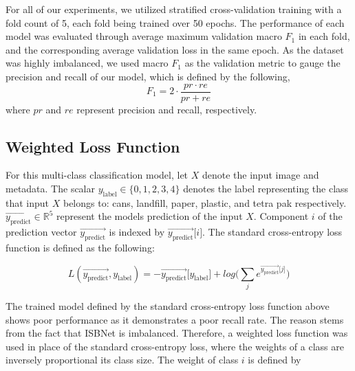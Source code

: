 \documentclass[conference]{ieeeconf}
\newcommand{\ora}[1]{\overrightarrow{#1}}
\begin{document}
For all of our experiments, we utilized stratified cross-validation training with a fold count of 5, each fold being trained over 50 epochs. The performance of each model was evaluated through average maximum validation macro $F_1$ in each fold, and the corresponding average validation loss in the same epoch. As the dataset was highly imbalanced, we used macro $F_1$ as the validation metric to gauge the precision and recall of our model, which is defined by the following,
\begin{equation*}
    F_1 = 2\cdot \frac{pr \cdot re}{pr + re}
\end{equation*}
where $pr$ and $re$ represent precision and recall, respectively.


\subsection{Weighted Loss Function}

For this multi-class classification model, let $X$ denote the input image and metadata. The scalar $y_\text{label} \in \{0, 1, 2, 3, 4\}$ denotes the label representing the class that input $X$ belongs to: cans, landfill, paper, plastic, and tetra pak respectively. $\ora{y_\text{predict}} \in \mathbb{R}^{5}$ represent the models prediction of the input $X$. Component $i$ of the prediction vector $\ora{y_\text{predict}}$ is indexed by $\ora{y_\text{predict}} \lbrack i \rbrack$. The standard cross-entropy loss function is defined as the following:

\begin{equation*}
    L(\ora{y_\text{predict}}, y_\text{label}) = -\ora{y_\text{predict}} \lbrack y_\text{label} \rbrack + log\bigg({\sum_{j} {e^{\ora{y_\text{predict}} \lbrack j \rbrack}}}\bigg)
\end{equation*}

The trained model defined by the standard cross-entropy loss function above shows poor performance as it demonstrates a poor recall rate. The reason stems from the fact that ISBNet is imbalanced. Therefore, a weighted loss function was used in place of the standard cross-entropy loss, where the weights of a class are inversely proportional its class size. The weight of class $i$ is defined by 
\end{document}
